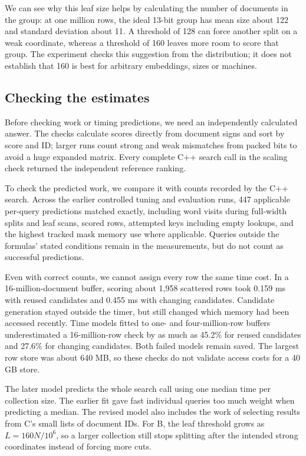 We can see why this leaf size helps by calculating the number of documents in the group: at one million rows,
the ideal 13-bit group has mean size about 122 and standard deviation about 11. A threshold
of 128 can force another split on a weak coordinate, whereas a threshold of 160 leaves more
room to score that group. The experiment checks this suggestion from the distribution;
it does not establish that 160 is best for arbitrary embeddings, sizes or machines.

\subsection{Checking the estimates}
Before checking work or timing predictions, we need an independently calculated answer.
The checks calculate scores directly from document signs and sort by score and ID; larger
runs count strong and weak mismatches from packed bits to avoid a huge expanded matrix.
Every complete C++ search call in the scaling check returned the independent reference ranking.

To check the predicted work, we compare it with counts recorded by the C++ search. Across the earlier
controlled tuning and evaluation runs, 447 applicable per-query predictions matched exactly,
including word visits during full-width splits and leaf scans, scored rows, attempted keys
including empty lookups, and the highest tracked mask memory use where applicable. Queries outside the formulas' stated
conditions remain in the measurements, but do not count as successful predictions.

Even with correct counts, we cannot assign every row the same time cost. In a
16-million-document buffer, scoring about 1,958 scattered rows took 0.159 ms with reused
candidates and 0.455 ms with changing candidates. Candidate generation stayed outside the
timer, but still changed which memory had been accessed recently. Time models fitted to one- and
four-million-row buffers underestimated a 16-million-row check by as much as 45.2\% for
reused candidates and 27.6\% for changing candidates. Both failed models remain saved.
The largest row store was about 640 MB, so these checks do not validate access costs for
a 40 GB store.

The later model predicts the whole search call using one median time per collection size.
The earlier fit gave fast individual queries too much weight when predicting a median. The
revised model also includes the work of selecting results from C's small lists of document IDs.
For B, the leaf threshold grows as $L=160N/10^6$, so a larger collection still stops splitting
after the intended strong coordinates instead of forcing more cuts.

